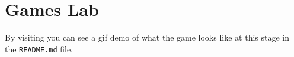 \section{Games Lab}
By visiting  you can see a gif demo of what
the game looks like at this stage in the \texttt{README.md} file.
